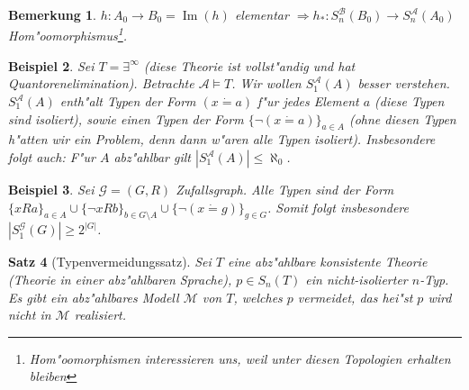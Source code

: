 \documentclass[a4paper,12pt,numbers=noenddot,parskip=full]{scrartcl}
\newcommand{\scrA}{\mathcal{A}}
\newcommand{\scrB}{\mathcal{B}}
\DeclareMathOperator{\im}{Im}
\theoremstyle{dotless}
\newtheorem{theorem}{Satz}[section]
\newtheorem{example}[theorem]{Beispiel}
\newtheorem{remark}[theorem]{Bemerkung}
\begin{document}
\begin{remark}
	$h: A_0 \longrightarrow B_0 = \im (h)$ elementar $\Longrightarrow h_* : S_n^\scrB (B_0) \longrightarrow S_n^\scrA (A_0)$ Hom"oomorphismus\footnote{Hom"oomorphismen interessieren uns, weil unter diesen Topologien erhalten bleiben}.
\end{remark}
\begin{example}
	Sei $T = \exists^\infty$ (diese Theorie ist vollst"andig und hat Quantorenelimination). Betrachte $\scrA \models T$. Wir wollen $S_1^\scrA(A)$ besser verstehen. $S_1^\scrA(A)$ enth"alt Typen der Form $(x \dot= a)$ f"ur jedes Element $a$ (diese Typen sind isoliert), sowie einen Typen der Form $\{\lnot (x \dot= a) \}_{a \in A}$ (ohne diesen Typen h"atten wir ein Problem, denn dann w"aren alle Typen isoliert).
	Insbesondere folgt auch: F"ur $A$ abz"ahlbar gilt $|S_1^\scrA (A)| \leq \aleph_0$.
\end{example}
\begin{example}
	Sei $\mathcal{G} = (G, R)$ Zufallsgraph. Alle Typen sind der Form $\{xRa \}_{a \in A} \cup \{\lnot xRb \}_{b \in G \setminus A} \cup \{\lnot (x \dot= g) \}_{g \in G}$. Somit folgt insbesondere $|S^\mathcal{G}_1 (G)| \geq 2^{|G|}$.
\end{example}
\begin{theorem}[Typenvermeidungssatz]
	Sei $T$ eine abz"ahlbare konsistente Theorie (Theorie in einer abz"ahlbaren Sprache), $p \in S_n(T)$ ein nicht-isolierter $n$-Typ. Es gibt ein abz"ahlbares Modell $\mathcal{M}$ von $T$, welches $p$ vermeidet, das hei"st $p$ wird nicht in $\mathcal{M}$ realisiert.
\end{theorem}
\end{document}
